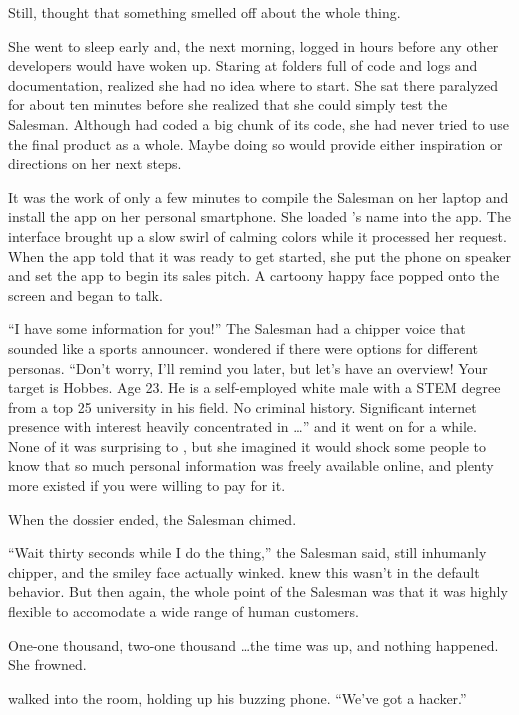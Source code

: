 Still, {\protag} thought that something smelled off about the whole thing.

She went to sleep early and, the next morning, logged in hours before any other developers would have woken up. Staring at folders full of code and logs and documentation, {\protag} realized she had no idea where to start.  She sat there paralyzed for about ten minutes before she realized that she could simply test the Salesman. Although {\protag} had coded a big chunk of its code, she had never tried to use the final product as a whole. Maybe doing so would provide either inspiration or directions on her next steps.

It was the work of only a few minutes to compile the Salesman on her laptop and install the app on her personal smartphone. She loaded {\sidetag}'s name into the app. The interface brought up a slow swirl of calming colors while it processed her request. When the app told {\protag} that it was ready to get started, she put the phone on speaker and set the app to begin its sales pitch. A cartoony happy face popped onto the screen and began to talk.

``I have some information for you!'' The Salesman had a chipper voice that sounded like a sports announcer. {\protag} wondered if there were options for different personas. ``Don't worry, I'll remind you later, but let's have an overview! Your target is {\sidetag} Hobbes. Age 23. He is a self-employed white male with a STEM degree from a top 25 university in his field. No criminal history. Significant internet presence with interest heavily concentrated in \dots'' and it went on for a while. None of it was surprising to {\protag}, but she imagined it would shock some people to know that so much personal information was freely available online, and plenty more existed if you were willing to pay for it.

When the dossier ended, the Salesman chimed.

``Wait thirty seconds while I do the thing,'' the Salesman said, still inhumanly chipper, and the smiley face actually winked. {\protag} knew this wasn't in the default behavior. But then again, the whole point of the Salesman was that it was highly flexible to accomodate a wide range of human customers.

One-one thousand, two-one thousand \dots the time was up, and nothing happened. She frowned. 

{\sidetag} walked into the room, holding up his buzzing phone. ``We've got a hacker.''

